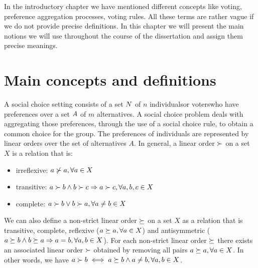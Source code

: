 
In the introductory chapter we have mentioned different concepts like voting, preference aggregation processes, voting rules. All these terms are rather vague if we do not provide precise definitions.
In this chapter we will present the main notions we will use throughout the course of the dissertation and assign them precise meanings.

\section{Main concepts and definitions}

A social choice setting consists of a set $N$ of $n$ individuals\textemdash or voters\textemdash who have preferences over a set $A$ of $m$ alternatives.
A social choice problem deals with aggregating those preferences, through the use of a social choice rule, to obtain a common choice for the group.
The preferences of individuals are represented by linear orders over the set of alternatives $A$.
In general, a linear order $\mathbin{\succ}$ on a set $X$ is a relation that is:
\vspace{-0.3em}
\begin{itemize}
	\itemsep-0.5em 
	\item irreflexive: $a \not\succ a, \forall a \in X$
	\item transitive: $a \succ b \land b \succ c \Rightarrow a \succ c, \forall a,b,c \in X$
	\item complete: $a \succ b \lor b \succ a, \forall a \neq b \in X$
\end{itemize} 
\vspace{-0.3em}
We can also define a non-strict linear order $\mathbin{\succeq}$ on a set $X$ as a relation that is transitive, complete, reflexive ($a \succeq a, \forall a \in X$) and antisymmetric ($a \succeq b \land b \succeq a \Rightarrow a = b, \forall a,b \in X$).
For each non-strict linear order $\succeq$ there exists an associated linear order $\succ$ obtained by removing all pairs $a \succeq a, \forall a \in X$. In other words, we have $a \succ b \iff a \succeq b \land a \neq b, \forall a,b \in X$.

